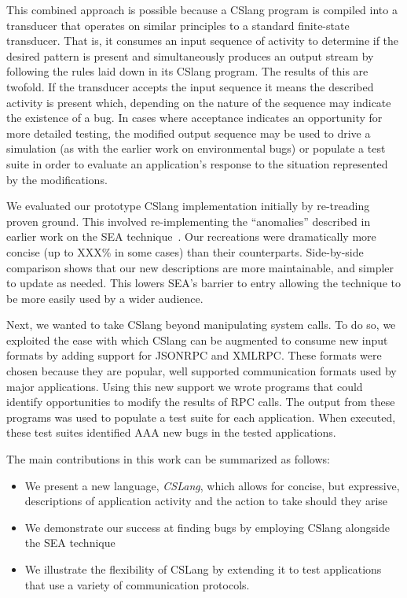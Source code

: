 This combined approach is possible
because a CSlang program
is compiled into a transducer
that operates on similar principles
to a standard finite-state transducer.
That is,
it consumes an input sequence of activity
to determine if the desired pattern is present
and simultaneously produces an output stream by
following the rules laid down in its CSlang program.
The results of this are twofold.
If the transducer accepts the input sequence
it means the described activity is present which,
depending on the nature of the sequence
may indicate the existence of a bug.
In cases where acceptance indicates an opportunity
for more detailed testing,
the modified output sequence may be used
to drive a simulation (as with the earlier work on environmental bugs) or populate
a test suite in order to evaluate an application's response
to the situation represented by the modifications.

We evaluated our prototype CSlang implementation initially by 
re-treading proven ground.
This involved re-implementing the ``anomalies''  
described in earlier work on the SEA technique~\cite{crashsim}.
Our recreations were dramatically more concise (up to XXX\% in some cases)
than their counterparts.  Side-by-side comparison shows that our new
descriptions are
more maintainable,
and simpler to update as needed.
This lowers SEA's barrier to entry allowing the
technique to be more easily used by a wider audience.

Next, we wanted to take CSlang beyond manipulating system calls.
To do so, 
we exploited the ease with which
CSlang can be augmented
to consume new input formats
by adding support for JSONRPC and XMLRPC.
These formats were chosen
because they are popular,
well supported communication formats
used by major applications.
Using this new support
we wrote programs
that could identify opportunities
to modify the results of RPC calls.
The output from these programs was used to populate a test suite
for each application.
When executed, these test suites identified AAA new bugs in the tested applications.

The main contributions in this work can be summarized as follows:

\begin{itemize}

\item{We present a new language, {\em CSLang},
  which allows for concise, but expressive, descriptions of
    application activity and the action to take should they arise}

\item{We demonstrate our success at finding bugs by employing CSlang
  alongside the SEA technique}

\item{We illustrate the flexibility of CSLang by extending it to test applications
that use a variety of communication protocols. }

\end{itemize}

